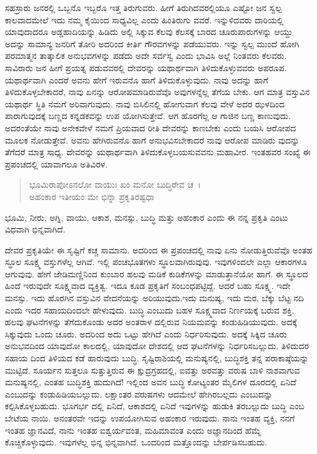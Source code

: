 ಸಹಸ್ರಾರು ಜನರಲ್ಲಿ ಒಬ್ಬನೊ ಇಬ್ಬರೊ ಇತ್ತ ತಿರುಗುವರು. ಹೀಗೆ ತಿರುಗಿದವರಲ್ಲಿಯೂ ಎಷ್ಟೋ ಜನ ಸ್ವಲ್ಪ ಕಾಲವಾದಮೇಲೆ ಇದು ನಮ್ಮ ಕೈಯಿಂದ ಸಾಧ್ಯವಿಲ್ಲ ಎಂದು ಹಿಂತಿರುಗು ವವರೆ. ಇನ್ನುಳಿದವರು ದಾರಿಯಲ್ಲಿ ಯಾವುದಾದರೂ ಅಡ್ಡಹಾದಿಯನ್ನು ಹಿಡಿದು ಅಲ್ಲಿ ಸಿಕ್ಕುವ ಕೆಲವು ಕೆಲಸಕ್ಕೆ ಬಾರದ ಚೂರುಪಾರುಗಳನ್ನು ಆಯ್ದು ಅದನ್ನು ಸಾಮಾನ್ಯ ಜನರಿಗೆ ತೋರಿ ಅದರಿಂದ ಕೀರ್ತಿ ಗೌರವಗಳನ್ನು ಪಡೆಯುವರು. ಇನ್ನು ಸ್ವಲ್ಪ ಮುಂದೆ ಹೋಗಿ ಪರಮಾತ್ಮನ ತಾತ್ಕಾಲಿಕ ಅನುಭವಗಳನ್ನು ಪಡೆದು ಅದೇ ಸರ್ವಸ್ವ ಎಂದು ಭಾವಿಸಿ ಅಲ್ಲೆ ನಿಂತವರು ಕೆಲವರು. ಸಾವಿರಾರು ಜನ ಹೀಗೆ ಪ್ರಯತ್ನ ಪಡುವವರಲ್ಲಿ ದೇವರನ್ನು ಯಥಾರ್ಥವಾಗಿ ತಿಳಿದುಕೊಳ್ಳುವವರು ಅಪರೂಪ. ಯಥಾರ್ಥವಾಗಿ ಎಂದರೆ ಅವನು ಹೇಗೆ ಇರುವನೊ ಹಾಗೆ ತಿಳಿದುಕೊಳ್ಳುವುದು. ನಾವು ಅದನ್ನು ಹಾಗೆ ತಿಳಿದುಕೊಳ್ಳಬೇಕಾದರೆ, ನಾವು ಏನನ್ನು ಆರೋಪಮಾಡಿರುವೆವೊ ಅವುಗಳನ್ನೆಲ್ಲ ತೆಗೆಯ ಬೇಕು. ಆಗ ಮಾತ್ರ ವಸ್ತುವಿನ ಯಥಾರ್ಥ ಸ್ಥಿತಿ ನಮಗೆ ಅರಿವಾಗುವುದು. ನಾವು ಬಿಸಿಲಿನಲ್ಲಿ ಹೋಗುವಾಗ ಕೆಲವು ವೇಳೆ ಅದರ ಝಳದಿಂದ ಪಾರಾಗುವುದಕ್ಕೆ ಬಣ್ಣದ ಕನ್ನಡಕವನ್ನು ಉಪ ಯೋಗಿಸುತ್ತೇವೆ. ಆಗ ಹೊರಗೆಲ್ಲ ಆ ಗಾಜಿನ ಬಣ್ಣ ಕಾಣುವುದು. ಅದರಂತೆಯೇ ನಾವು ಅನೇಕವೇಳೆ ನಮಗೆ ಪ್ರಿಯವಾದ ರೀತಿ ದೇವರನ್ನು ಕಾಣಬೇಕು ಎಂದು ಬಯಸಿ ಆರೋಪದ ಮೂಲಕ ನೋಡುತ್ತೇವೆ. ಅವನು ಹೇಗಿರುವನೊ ಹಾಗೆ ಅನುಭವಿಸಬೇಕಾದರೆ ನಾವು ಆರೋಪ ಮಾಡಿರು ವುದನ್ನು ತೆಗೆದರೆ ಮಾತ್ರ ಸಾಧ್ಯ. ದೇವರನ್ನು ಯಥಾರ್ಥವಾಗಿ ತಿಳಿದುಕೊಳ್ಳಬಯಸುವವನು ಮಹಾವೀರ. ಇಂತಹವರ ಸಂಖ್ಯೆ ಈ ಪ್ರಪಂಚದಲ್ಲಿ ಯಾವಾಗಲೂ ಅತಿವಿರಳ.

\begin{verse}
ಭೂಮಿರಾಪೋಽನಲೋ ವಾಯುಃ ಖಂ ಮನೋ ಬುದ್ಧಿರೇವ ಚ~।\\ಅಹಂಕಾರ ಇತೀಯಂ ಮೇ ಭಿನ್ನಾ ಪ್ರಕೃತಿರಷ್ಟಧಾ 
\end{verse}

{\small ಭೂಮಿ, ನೀರು, ಅಗ್ನಿ, ವಾಯು, ಆಕಾಶ, ಮನಸ್ಸು, ಬುದ್ಧಿ ಮತ್ತು ಅಹಂಕಾರ ಎಂದು ಈ ನನ್ನ ಪ್ರಕೃತಿ ಎಂಟು ವಿಧವಾಗಿ ಭಿನ್ನವಾಗಿದೆ.}

ದೇವರ ಪ್ರಕೃತಿಯೇ ಈ ಸೃಷ್ಟಿಗೆ ಕಚ್ಚ ಸಾಮಾನು. ಅದರಿಂದ ಈ ಪ್ರಪಂಚದಲ್ಲಿ ನಾವು ಏನು ನೋಡುತ್ತಿರುವೆವೊ ಅಂತಹ ಸ್ಥೂಲ ಸೂಕ್ಷ್ಮ ವಸ್ತುಗಳೆಲ್ಲ ಆಗಿವೆ. ಇಲ್ಲಿ ಪಂಚಭೂತಗಳು ಸ್ಥೂಲವಾಗಿರುವುವು. ಇವುಗಳಿಂದಲೇ ಎಲ್ಲಾ ಆಕಾರಗಳೂ ಆಗುವುವು. ಹೇಗೆ ಜೇಡಿಮಣ್ಣಿನಿಂದ ಕುಂಬಾರ ಹಲವು ಮಡಿಕೆ ಕುಡಿಕೆಗಳನ್ನು ಮಾಡುತ್ತಾನೆಯೋ ಹಾಗೆ. ಈ ಸ್ಥೂಲದ ಹಿಂದೆ ಇರುವುದೇ ಸೂಕ್ಷ್ಮವಾದ ವ್ಯಕ್ತಿತ್ವ. ಇದೂ ಕೂಡ ಪ್ರಕೃತಿಗೆ ಸಂಬಂಧಪಟ್ಟಿದ್ದೆ. ಆದರೆ ಬಹು ಸೂಕ್ಷ್ಮ. ಇದೇ ಮನಸ್ಸು. ಇದು ಹೊರಗಿನ ವಸ್ತುವಿನ ವೇದನೆಯನ್ನು ಅರಿಯುವುದು.ಇದು ಮನುಷ್ಯ, ಇದು ಮರ, ಬೆಕ್ಕು ಬೆಟ್ಟ ನದಿ ಎಂದು ಇದರ ಸಹಾಯದಿಂದಲೇ ಹೇಳುವುದು. ಬುದ್ಧಿ ಎಂಬುದು ಬಹಳ ಸೂಕ್ಷ್ಮವಾದ ನಿರ್ಣಯಕ್ಕೆ ಬರುವ ಶಕ್ತಿ. ಹಲವು ಘಟನೆಗಳನ್ನು ತೆಗೆದುಕೊಂಡು ಅದರ ಅಂತರಾಳ ದಲ್ಲಿರುವ ನಿಯಮವನ್ನು ಕಂಡುಹಿಡಿಯುವುದು. ಅದಕ್ಕೆ ಸಿಕ್ಕುವುದು ಒಂದು ಚೂರು. ಅದರಿಂದ ಅದು ಒಟ್ಟು ಹೇಗಿದೆ ಎಂದು ನಿರ್ಧರಿಸುವುದು. ಅದಕ್ಕೆ ಸಿಕ್ಕಿದ ಚೂರು ಅನುಭವದಿಂದ ಯಾವುದೋ ಕಾಲದಲ್ಲಿ, ಯಾವುದೋ ದೇಶದಲ್ಲಿ ಆದ ಘಟನೆಗಳನ್ನು ನಿರ್ಧರಿಸಬಲ್ಲುದು. ತಿಳಿದುದರ ಸಹಾಯ ದಿಂದ ತಿಳಿಯದ ಕಡೆ ಹಾರುವುದು ಬುದ್ಧಿ. ಸೃಷ್ಟಿರಾಶಿಯಲ್ಲಿ ಮನುಷ್ಯನಲ್ಲಿ, ಬುದ್ಧಿಶಕ್ತಿ ತನ್ನ ಪರಾಕಾಷ್ಠೆಯನ್ನು ಮುಟ್ಟಿದೆ. ಸೂರ್ಯನ ಸುತ್ತಲೂ ಸುತ್ತುತ್ತಿರುವ ಈ ಕ್ಷುದ್ರಗ್ರಹದಲ್ಲಿ, ಐವತ್ತು ಅರವತ್ತು ವರುಷ ಬಾಳಿ ನಾಶವಾಗುವ ಮನುಷ್ಯನಲ್ಲಿ, ಎಂತಹ ಬುದ್ಧಿಶಕ್ತಿ ಹುದುಗಿದೆ! ಇಲ್ಲಿಂದ ಅವನ ಬುದ್ಧಿ ಕೋಟ್ಯಂತರ ಮೈಲಿಗಳ ದೂರದಲ್ಲಿ ಏನಿದೆ ಎಂಬುದನ್ನು ಕಂಡುಹಿಡಿಯಬಲ್ಲುದು. ಲಕ್ಷಾಂತರ ವರುಷಗಳು ಆದಮೇಲೆ ಹೇಗಿರಬಲ್ಲದು ಎಂಬುದನ್ನು ಕಲ್ಪಿಸಿಕೊಳ್ಳಬಹುದು. ಭೂಗರ್ಭ ದಲ್ಲಿ ಏನಿದೆ, ಆಕಾಶದಲ್ಲಿ ಏನಿದೆ ಇವುಗಳನ್ನು ಹುಡುಕಿ ತರಬಲ್ಲುದು ಬುದ್ಧಿ ಎಂಬ ಬೇಟೆಯ ನಾಯಿ. ಅನಂತರವೇ ಇದನ್ನು ಉಪಯೋಗಿಸುವ ಅಹಂಕಾರ ಇರುವುದು. ನಾನು ಇಂತಹ ವ್ಯಕ್ತಿ, ನನಗೆ ಇಂತಹ ಜ್ಞಾನವಿದೆ, ನಾನು ಇಂತಹ ಐಶ್ವರ್ಯವಂತ, ಮಹಿಮಾವಂತ ಎಂದು ಅಜ್ಞಾನದಿಂದ ಹೆಮ್ಮೆ ಕೊಚ್ಚಿಕೊಳ್ಳುವುದು. ಇವುಗಳೆಲ್ಲ ಭಿನ್ನ ಭಿನ್ನವಾಗಿದೆ. ಒಂದರಿಂದ ಮತ್ತೊಂದನ್ನು ಬೇರ್ಪಡಿಸಬಹುದು.

